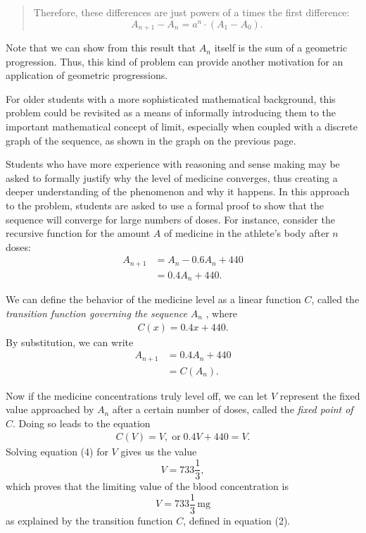 {\begin{description}
\begin{quotation}
        Therefore, these differences are just powers of a times the first difference:
        $$
        A_{n+1}-A_n
          =a^n\cdot (A_1-A_0).
        $$
      \end{quotation}

      Note that we can show from this result that $A_n$ itself is the sum of a geometric progression. Thus, this kind of problem can provide another motivation for an application of geometric progressions.

      \item[Method 4.] For older students with a more sophisticated mathematical background, this problem could be revisited as a means of informally introducing them to the important mathematical concept of limit, especially when coupled with a discrete graph of the sequence, as shown in the graph on the previous page.

      \item[Method 5.] Students who have more experience with reasoning and sense making may be asked to formally justify why the level of medicine converges, thus creating a deeper understanding of the phenomenon and why it happens. In this approach to the problem, students are asked to use a formal proof to show that the sequence will converge for large numbers of doses. For instance, consider the recursive function for the amount $A$ of medicine in the athlete's body after $n$ doses:
      \begin{align*}
        A_{n+1}
          &=A_n-0.6A_n+440 \\
          &=0.4A_n+440. \tag{1}
      \end{align*}

      We can define the behavior of the medicine level as a linear function $C$, called the \emph{transition function governing the sequence} $A_n$ , where
        \begin{align*}
          C(x)=0.4x+440. \tag{2}
        \end{align*}
      By substitution, we can write
      \begin{align*}
        A_{n+1}
          &=0.4A_n+440 \\
          &=C(A_n). \tag{3}
      \end{align*}

      Now if the medicine concentrations truly level off, we can let $V$ represent the fixed value approached by $A_n$ after a certain number of doses, called the \emph{fixed point of} $C$. Doing so leads to the equation\vspace{1.5\baselineskip}
      \begin{align*}
        C(V)=V, \; \text{or} \; 0.4V+440=V. \tag{4}
      \end{align*}
      Solving equation (4) for $V$ gives us the value
      $$
        V=733\frac{1}{3},
      $$
      which proves that the limiting value of the blood concentration is
      $$
        V=733\frac{1}{3} \, \text{mg}
      $$
      as explained by the transition function $C$, defined in equation (2).


\end{description}}
